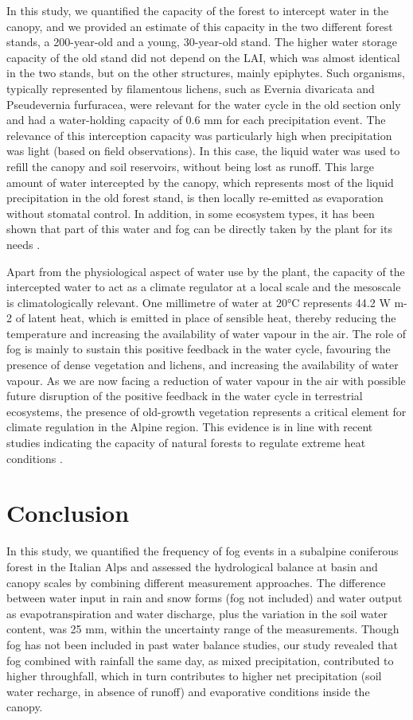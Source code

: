 \documentclass[10pt,letterpaper]{article}
\begin{document}
In this study, we quantified the capacity of the forest to intercept water in the canopy, and we provided an estimate of this capacity in the two different forest stands, a 200-year-old and a young, 30-year-old stand. The higher water storage capacity of the old stand did not depend on the LAI, which was almost identical in the two stands, but on the other structures, mainly epiphytes. Such organisms, typically represented by filamentous lichens, such as Evernia divaricata and Pseudevernia furfuracea, were relevant for the water cycle in the old section only and had a water-holding capacity of 0.6 mm for each precipitation event. The relevance of this interception capacity was particularly high when precipitation was light (based on field observations). In this case, the liquid water was used to refill the canopy and soil reservoirs, without being lost as runoff. This large amount of water intercepted by the canopy, which represents most of the liquid precipitation in the old forest stand, is then locally re-emitted as evaporation without stomatal control. In addition, in some ecosystem types, it has been shown that part of this water and fog can be directly taken by the plant for its needs \cite{Burgess}. 

Apart from the physiological aspect of water use by the plant, the capacity of the intercepted water to act as a climate regulator at a local scale and the mesoscale is climatologically relevant. One millimetre of water at 20°C represents 44.2 W m-2 of latent heat, which is emitted in place of sensible heat, thereby reducing the temperature and increasing the availability of water vapour in the air. The role of fog is mainly to sustain this positive feedback in the water cycle, favouring the presence of dense vegetation and lichens, and increasing the availability of water vapour. As we are now facing a reduction of water vapour in the air \cite{Xiao} with possible future disruption of the positive feedback in the water cycle in terrestrial ecosystems, the presence of old-growth vegetation represents a critical element for climate regulation in the Alpine region. This evidence is in line with recent studies indicating the capacity of natural forests to regulate extreme heat conditions \cite{Alkama}.

\section{Conclusion}

In this study, we quantified the frequency of fog events in a subalpine coniferous forest in the Italian Alps and assessed the hydrological balance at basin and canopy scales by combining different measurement approaches. The difference between water input in rain and snow forms (fog not included) and water output as evapotranspiration and water discharge, plus the variation in the soil water content, was 25 mm, within the uncertainty range of the measurements. Though fog has not been included in past water balance studies, our study revealed that fog combined with rainfall the same day, as mixed precipitation, contributed to higher throughfall, which in turn contributes to higher net precipitation (soil water recharge, in absence of runoff) and evaporative conditions inside the canopy. 
\end{document}
